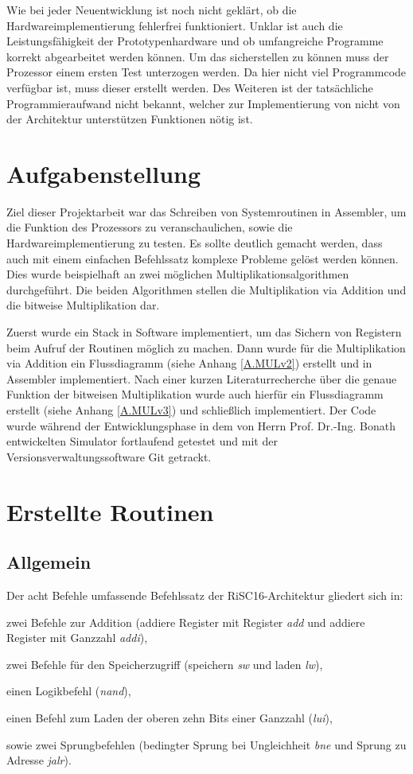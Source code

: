 \documentclass[fleqn, a4paper, 11pt]{article}       %
\begin{document}
Wie bei jeder Neuentwicklung ist noch nicht geklärt, ob die Hardwareimplementierung fehlerfrei funktioniert. Unklar ist auch die Leistungsfähigkeit der Prototypenhardware und ob umfangreiche Programme korrekt abgearbeitet werden können. Um das sicherstellen zu können muss der Prozessor einem ersten Test unterzogen werden. Da hier nicht viel Programmcode verfügbar ist, muss dieser erstellt werden.  Des Weiteren ist der tatsächliche Programmieraufwand nicht bekannt, welcher zur Implementierung von nicht von der Architektur unterstützen Funktionen nötig ist.




\section{Aufgabenstellung}
Ziel dieser Projektarbeit war das Schreiben von Systemroutinen in Assembler, um die Funktion des Prozessors zu veranschaulichen, sowie die Hardwareimplementierung zu testen. Es sollte deutlich gemacht werden, dass auch mit einem einfachen Befehlssatz komplexe Probleme gelöst werden können. Dies wurde beispielhaft an zwei möglichen Multiplikationsalgorithmen durchgeführt. Die beiden Algorithmen stellen die Multiplikation via Addition und die bitweise Multiplikation dar. 

Zuerst wurde ein Stack in Software implementiert, um das Sichern von Registern beim Aufruf der Routinen möglich zu machen. Dann wurde für die Multiplikation via Addition ein Flussdiagramm (siehe Anhang \ref{A.MULv2}) erstellt und in Assembler implementiert. Nach einer kurzen Literaturrecherche über die genaue Funktion der bitweisen Multiplikation wurde auch hierfür ein Flussdiagramm erstellt (siehe Anhang \ref{A.MULv3}) und schließlich implementiert. Der Code wurde während der Entwicklungsphase in dem von Herrn Prof. Dr.-Ing. Bonath entwickelten Simulator fortlaufend getestet und mit der Versionsverwaltungssoftware Git getrackt.
\newpage


\section{Erstellte Routinen}
\subsection{Allgemein}

Der acht Befehle umfassende Befehlssatz der RiSC16-Architektur gliedert sich in:

\begin{compactitem}
     \item zwei Befehle zur Addition (addiere Register mit Register \emph{add} und addiere Register mit Ganzzahl \emph{addi}),
     \item zwei Befehle für den Speicherzugriff (speichern \emph{sw} und laden \emph{lw}),
     \item einen Logikbefehl (\emph{nand}),
     \item einen Befehl zum Laden der oberen zehn Bits einer Ganzzahl (\emph{lui}),
     \item sowie zwei Sprungbefehlen (bedingter Sprung bei Ungleichheit \emph{bne} und Sprung zu Adresse \emph{jalr}).
 \end{compactitem}
\end{document}
